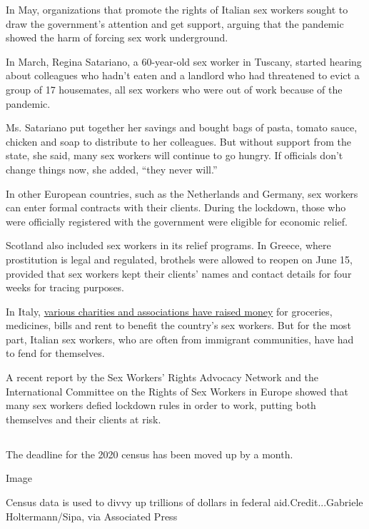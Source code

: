 In May, organizations that promote the rights of Italian sex workers
sought to draw the government's attention and get support, arguing that
the pandemic showed the harm of forcing sex work underground.

In March, Regina Satariano, a 60-year-old sex worker in Tuscany, started
hearing about colleagues who hadn't eaten and a landlord who had
threatened to evict a group of 17 housemates, all sex workers who were
out of work because of the pandemic.

Ms. Satariano put together her savings and bought bags of pasta, tomato
sauce, chicken and soap to distribute to her colleagues. But without
support from the state, she said, many sex workers will continue to go
hungry. If officials don't change things now, she added, ``they never
will.''

In other European countries, such as the Netherlands and Germany, sex
workers can enter formal contracts with their clients. During the
lockdown, those who were officially registered with the government were
eligible for economic relief.

Scotland also included sex workers in its relief programs. In Greece,
where prostitution is legal and regulated, brothels were allowed to
reopen on June 15, provided that sex workers kept their clients' names
and contact details for four weeks for tracing purposes.

In Italy,
\href{https://www.produzionidalbasso.com/project/covid19-nessuna-da-sola-solidarieta-immediata-alle-lavoratrici-sessuali-piu-colpite-dall-emergenza/}{various
charities and associations have raised money} for groceries, medicines,
bills and rent to benefit the country's sex workers. But for the most
part, Italian sex workers, who are often from immigrant communities,
have had to fend for themselves.

A recent report by the Sex Workers' Rights Advocacy Network and the
International Committee on the Rights of Sex Workers in Europe showed
that many sex workers defied lockdown rules in order to work, putting
both themselves and their clients at risk.

\hypertarget{-4}{%
\subsection{}\label{-4}}

The deadline for the 2020 census has been moved up by a month.

Image

Census data is used to divvy up trillions of dollars in federal
aid.Credit...Gabriele Holtermann/Sipa, via Associated Press

